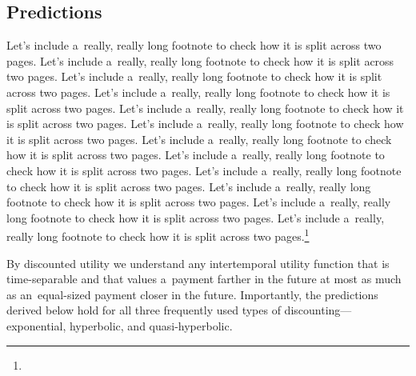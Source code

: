 


\subsection{Predictions}
\label{sec:Predictions}

\blindtext

Let's include a~really, really long footnote to check how it is split across two pages. Let's include a~really, really long footnote to check how it is split across two pages. Let's include a~really, really long footnote to check how it is split across two pages. Let's include a~really, really long footnote to check how it is split across two pages. Let's include a~really, really long footnote to check how it is split across two pages. Let's include a~really, really long footnote to check how it is split across two pages. Let's include a~really, really long footnote to check how it is split across two pages. Let's include a~really, really long footnote to check how it is split across two pages. Let's include a~really, really long footnote to check how it is split across two pages. Let's include a~really, really long footnote to check how it is split across two pages. Let's include a~really, really long footnote to check how it is split across two pages. Let's include a~really, really long footnote to check how it is split across two pages.\footnote{\blindmathfalse\blindtext[7]\blindmathtrue}

By discounted utility we understand any intertemporal utility function that is time-separable and that values a~payment farther in the future at most as much as an~equal-sized payment closer in the future. Importantly, the predictions derived below hold for all three frequently used types of discounting---exponential, hyperbolic, and quasi-hyperbolic.

